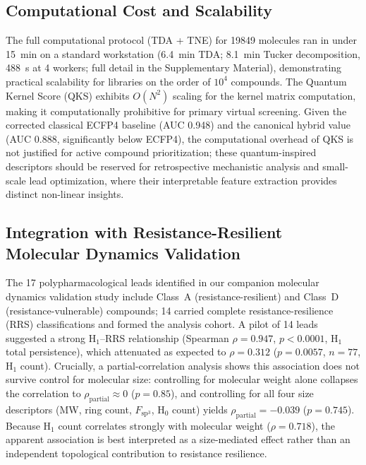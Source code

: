 \documentclass[11pt,a4paper]{article}
\begin{document}
\subsection{Computational Cost and Scalability}

The full computational protocol (TDA + TNE) for \num{19849} molecules ran in under \SI{15}{\minute} on a standard workstation (\SI{6.4}{\minute} TDA; \SI{8.1}{\minute} Tucker decomposition, \SI{488}{\second} at 4 workers; full detail in the Supplementary Material), demonstrating practical scalability for libraries on the order of $10^4$ compounds. The Quantum Kernel Score (QKS) exhibits $O(N^2)$ scaling for the kernel matrix computation, making it computationally prohibitive for primary virtual screening. Given the corrected classical ECFP4 baseline (AUC \num{0.948}) and the canonical hybrid value (AUC \num{0.888}, significantly below ECFP4), the computational overhead of QKS is not justified for active compound prioritization; these quantum-inspired descriptors should be reserved for retrospective mechanistic analysis and small-scale lead optimization, where their interpretable feature extraction provides distinct non-linear insights.

\subsection{Integration with Resistance-Resilient Molecular Dynamics Validation}

The 17 polypharmacological leads identified in our companion molecular dynamics validation study \citep{temgoua2027md} include Class~A (resistance-resilient) and Class~D (resistance-vulnerable) compounds; 14 carried complete resistance-resilience (RRS) classifications and formed the analysis cohort. A pilot of 14 leads suggested a strong H$_1$--RRS relationship (Spearman $\rho = \num{0.947}$, $p < \num{0.0001}$, H$_1$ total persistence), which attenuated as expected to $\rho = \num{0.312}$ ($p = \num{0.0057}$, $n = \num{77}$, H$_1$ count). Crucially, a partial-correlation analysis shows this association does not survive control for molecular size: controlling for molecular weight alone collapses the correlation to $\rho_{\text{partial}} \approx 0$ ($p = \num{0.85}$), and controlling for all four size descriptors (MW, ring count, $F_{\mathrm{sp}^3}$, H$_0$ count) yields $\rho_{\text{partial}} = -\num{0.039}$ ($p = \num{0.745}$). Because H$_1$ count correlates strongly with molecular weight ($\rho = \num{0.718}$), the apparent association is best interpreted as a size-mediated effect rather than an independent topological contribution to resistance resilience.
\end{document}
